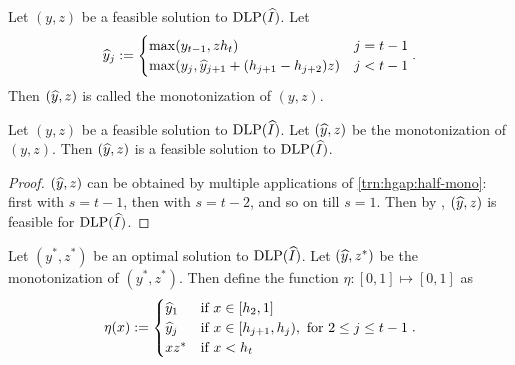\begin{definition}
Let $(y, z)$ be a feasible solution to $\operatorname{DLP}(\widehat{I})$. Let
\[ \widehat{y}_j := \begin{cases}
\max(y_{t-1}, zh_t) & j = t-1
\\ \max(y_j, \widehat{y}_{j+1} + (h_{j+1} - h_{j+2})z) & j < t-1
\end{cases}. \]
Then $(\widehat{y}, z)$ is called the monotonization of $(y, z)$.
\end{definition}
\begin{lemma}
\label{thm:hgap:mono-feas}
Let $(y, z)$ be a feasible solution to $\operatorname{DLP}(\widehat{I})$.
Let $(\widehat{y}, z)$ be the monotonization of $(y, z)$.
Then $(\widehat{y}, z)$ is a feasible solution to $\operatorname{DLP}(\widehat{I})$.
\end{lemma}
\begin{proof}
$(\widehat{y}, z)$ can be obtained by multiple applications of \cref{trn:hgap:half-mono}:
first with $s = t-1$, then with $s = t-2$, and so on till $s = 1$.
Then by , $(\widehat{y}, z)$ is feasible for $\operatorname{DLP}(\widehat{I})$.
\end{proof}

Let $(y^*, z^*)$ be an optimal solution to $\operatorname{DLP}(\widehat{I})$.
Let $(\widehat{y}, z^*)$ be the monotonization of $(y^*, z^*)$.
Then define the function $\eta: [0, 1] \mapsto [0, 1]$ as
\[ \eta(x) := \begin{cases}
\widehat{y}_1 & \textrm{if } x \in [h_2, 1]
\\ \widehat{y}_j & \textrm{if } x \in [h_{j+1}, h_j), \textrm{ for } 2 \le j \le t-1
\\ xz^* & \textrm{if } x < h_t
\end{cases}. \]

